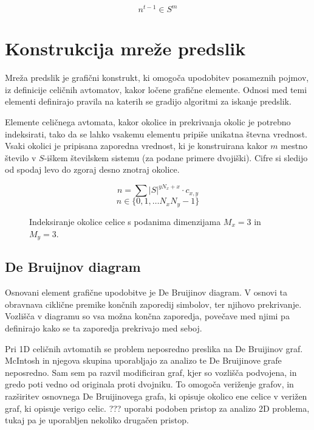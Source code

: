 \documentclass[12pt,a4paper,openany]{book}
\begin{document}
\[ n^{t-1} \in S^m \]

\chapter{Konstrukcija mreže predslik}

Mreža predslik je grafični konstrukt, ki omogoča upodobitev posameznih pojmov,
iz definicije celičnih avtomatov, kakor ločene grafične elemente. Odnosi med
temi elementi definirajo pravila na katerih se gradijo algoritmi za iskanje
predslik.

Elemente celičnega avtomata, kakor okolice in prekrivanja okolic je potrebno indeksirati,
tako da se lahko vsakemu elementu pripiše unikatna števna vrednost.
Vsaki okolici je pripisana zaporedna vrednost, ki je konstruirana kakor \(m\) mestno število
v \(S\)-iškem številskem sistemu (za podane primere dvojiški).
Cifre si sledijo od spodaj levo do zgoraj desno znotraj okolice.

\[ n = \sum |S|^{y N_x + x} \cdot c_{x,y} \]
\[ n \in \{0, 1, \dots N_x N_y -1\} \]

\begin{figure}[htb]
\centerline{}
\caption[Okolica.]{Indeksiranje okolice celice s podanima dimenzijama \(M_x=3\) in \(M_y=3\).}
\label{neighborhood_index}
\end{figure}

\section{De Bruijnov diagram}

Osnovani element grafične upodobitve je De Bruijinov diagram. V osnovi ta obravnava
ciklične premike končnih zaporedij simbolov, ter njihovo prekrivanje. Vozlišča v
diagramu so vsa možna končna zaporedja, povečave med njimi pa definirajo kako se
ta zaporedja prekrivajo med seboj.

Pri 1D celičnih avtomatih se problem neposredno preslika na De Bruijinov graf. McIntosh
in njegova skupina uporabljajo za analizo te De Bruijinove grafe neposredno. Sam sem pa
razvil modificiran graf, kjer so vozlišča podvojena, in gredo poti vedno od originala
proti dvojniku. To omogoča veriženje grafov, in razširitev osnovnega De Bruijinovega
grafa, ki opisuje okolico ene celice v verižen graf, ki opisuje verigo celic. ??? \cite{}
uporabi podoben pristop za analizo 2D problema, tukaj pa je uporabljen nekoliko
drugačen pristop.
\end{document}
